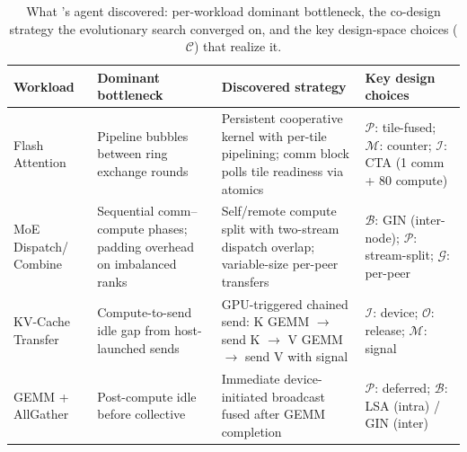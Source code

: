 \begin{table}[t]
\centering
\scriptsize
\setlength{\tabcolsep}{4pt}
\caption{What \cufuse{}'s agent discovered: per-workload dominant bottleneck, the co-design strategy the evolutionary search converged on, and the key design-space choices ($\mathcal{C}$) that realize it.}
\label{tab:strategy}
\begin{tabular}{@{}p{}p{}p{}p{}@{}}
\toprule
\textbf{Workload} & \textbf{Dominant bottleneck} & \textbf{Discovered strategy} & \textbf{Key design choices} \\
\midrule
Flash Attention & Pipeline bubbles between ring exchange rounds & Persistent cooperative kernel with per-tile pipelining; comm block polls tile readiness via atomics & $\mathcal{P}$: tile-fused; $\mathcal{M}$: counter; $\mathcal{I}$: CTA (1 comm + 80 compute) \\
MoE Dispatch/ Combine & Sequential comm--compute phases; padding overhead on imbalanced ranks & Self/remote compute split with two-stream dispatch overlap; variable-size per-peer transfers & $\mathcal{B}$: GIN (inter-node); $\mathcal{P}$: stream-split; $\mathcal{G}$: per-peer \\
KV-Cache Transfer & Compute-to-send idle gap from host-launched sends & GPU-triggered chained send: K GEMM $\to$ send K $\to$ V GEMM $\to$ send V with signal & $\mathcal{I}$: device; $\mathcal{O}$: release; $\mathcal{M}$: signal \\
GEMM + AllGather & Post-compute idle before collective & Immediate device-initiated broadcast fused after GEMM completion & $\mathcal{P}$: deferred; $\mathcal{B}$: LSA (intra) / GIN (inter) \\
\bottomrule
\end{tabular}
\vspace{-13pt}
\end{table}

